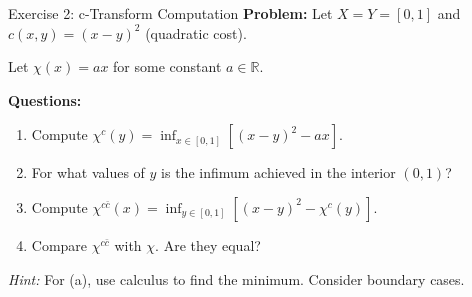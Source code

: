 \documentclass[aspectratio=169]{beamer}
\newcommand{\R}{\mathbb{R}}
\begin{document}
\begin{frame}{Exercise 2: c-Transform Computation}
\textbf{Problem:} Let $X = Y = [0,1]$ and $c(x,y) = (x-y)^2$ (quadratic cost).

Let $\chi(x) = ax$ for some constant $a \in \R$.

\vspace{0.3cm}
\textbf{Questions:}
\begin{enumerate}
    \item[(a)] Compute $\chi^c(y) = \inf_{x \in [0,1]} [(x-y)^2 - ax]$.
    \item[(b)] For what values of $y$ is the infimum achieved in the interior $(0,1)$?
    \item[(c)] Compute $\chi^{c\bar{c}}(x) = \inf_{y \in [0,1]} [(x-y)^2 - \chi^c(y)]$.
    \item[(d)] Compare $\chi^{c\bar{c}}$ with $\chi$. Are they equal?
\end{enumerate}

\vspace{0.3cm}
\textit{Hint:} For (a), use calculus to find the minimum. Consider boundary cases.
\end{frame}
\end{document}
